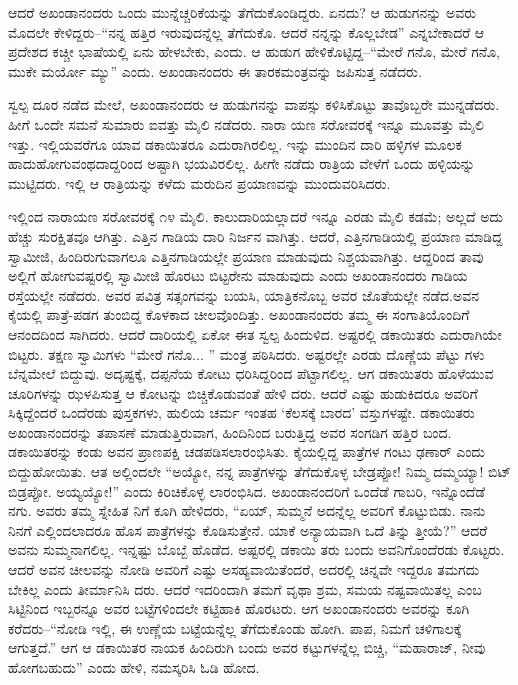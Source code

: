 ಆದರೆ ಅಖಂಡಾನಂದರು ಒಂದು ಮುನ್ನೆಚ್ಚರಿಕೆಯನ್ನು ತೆಗೆದುಕೊಂಡಿದ್ದರು. ಏನದು? ಆ ಹುಡುಗನನ್ನು ಅವರು ಮೊದಲೇ ಕೇಳಿದ್ದರು–“ನನ್ನ ಹತ್ತಿರ ಇರುವುದನ್ನೆಲ್ಲ ತೆಗೆದುಕೊ. ಆದರೆ ನನ್ನನ್ನು ಕೊಲ್ಲಬೇಡ” ಎನ್ನಬೇಕಾದರೆ ಆ ಪ್ರದೇಶದ ಕಚ್ಚೀ ಭಾಷೆಯಲ್ಲಿ ಏನು ಹೇಳಬೇಕು, ಎಂದು. ಆ ಹುಡುಗ ಹೇಳಿಕೊಟ್ಟಿದ್ದ–“ಮೇರೆ ಗನೊ, ಮೇರೆ ಗನೊ, ಮುಕೇ ಮರ್ಯೋ ಮ್ಯು” ಎಂದು. ಅಖಂಡಾನಂದರು ಈ ತಾರಕಮಂತ್ರವನ್ನು ಜಪಿಸುತ್ತ ನಡೆದರು.

ಸ್ವಲ್ಪ ದೂರ ನಡೆದ ಮೇಲೆ, ಅಖಂಡಾನಂದರು ಆ ಹುಡುಗನನ್ನು ವಾಪಸ್ಸು ಕಳಿಸಿಕೊಟ್ಟು ತಾವೊಬ್ಬರೇ ಮುನ್ನಡೆದರು. ಹೀಗೆ ಒಂದೇ ಸಮನೆ ಸುಮಾರು ಐವತ್ತು ಮೈಲಿ ನಡೆದರು. ನಾರಾ ಯಣ ಸರೋವರಕ್ಕೆ ಇನ್ನೂ ಮೂವತ್ತು ಮೈಲಿ ಇತ್ತು. ಇಲ್ಲಿಯವರೆಗೂ ಯಾವ ಡಕಾಯಿತರೂ ಎದುರಾಗಿರಲಿಲ್ಲ. ಇನ್ನು ಮುಂದಿನ ದಾರಿ ಹಳ್ಳಿಗಳ ಮೂಲಕ ಹಾದುಹೋಗುವಂಥದಾದ್ದರಿಂದ ಅಷ್ಟಾಗಿ ಭಯವಿರಲಿಲ್ಲ. ಹೀಗೇ ನಡೆದು ರಾತ್ರಿಯ ವೇಳೆಗೆ ಒಂದು ಹಳ್ಳಿಯನ್ನು ಮುಟ್ಟಿದರು. ಇಲ್ಲಿ ಆ ರಾತ್ರಿಯನ್ನು ಕಳೆದು ಮರುದಿನ ಪ್ರಯಾಣವನ್ನು ಮುಂದುವರಿಸಿದರು.

ಇಲ್ಲಿಂದ ನಾರಾಯಣ ಸರೋವರಕ್ಕೆ ೧೪ ಮೈಲಿ. ಕಾಲುದಾರಿಯಲ್ಲಾದರೆ ಇನ್ನೂ ಎರಡು ಮೈಲಿ ಕಡಮೆ; ಅಲ್ಲದೆ ಅದು ಹೆಚ್ಚು ಸುರಕ್ಷಿತವೂ ಆಗಿತ್ತು. ಎತ್ತಿನ ಗಾಡಿಯ ದಾರಿ ನಿರ್ಜನ ವಾಗಿತ್ತು. ಆದರೆ, ಎತ್ತಿನಗಾಡಿಯಲ್ಲಿ ಪ್ರಯಾಣ ಮಾಡಿದ್ದ ಸ್ವಾಮೀಜಿ, ಹಿಂದಿರುಗುವಾಗಲೂ ಎತ್ತಿನಗಾಡಿಯಲ್ಲೇ ಪ್ರಯಾಣ ಮಾಡುವುದು ನಿಶ್ಚಯವಾಗಿತ್ತು. ಆದ್ದರಿಂದ ತಾವು ಅಲ್ಲಿಗೆ ಹೋಗುವಷ್ಟರಲ್ಲಿ ಸ್ವಾಮೀಜಿ ಹೊರಟು ಬಿಟ್ಟರೇನು ಮಾಡುವುದು ಎಂದು ಅಖಂಡಾನಂದರು ಗಾಡಿಯ ರಸ್ತೆಯಲ್ಲೇ ನಡೆದರು. ಅವರ ಪವಿತ್ರ ಸತ್ಸಂಗವನ್ನು ಬಯಸಿ, ಯಾತ್ರಿಕನೊಬ್ಬ ಅವರ ಜೊತೆಯಲ್ಲೇ ನಡೆದ.ಅವನ ಕೈಯಲ್ಲಿ ಪಾತ್ರೆ-ಪಡಗ ತುಂಬಿದ್ದ ಕೊಳಕಾದ ಚೀಲವೊಂದಿತ್ತು. ಅಖಂಡಾನಂದರು ತಮ್ಮ ಈ ಸಂಗಾತಿಯೊಂದಿಗೆ ಆನಂದದಿಂದ ಸಾಗಿದರು. ಆದರೆ ದಾರಿಯಲ್ಲಿ ಏಕೋ ಈತ ಸ್ವಲ್ಪ ಹಿಂದುಳಿದ. ಅಷ್ಟರಲ್ಲಿ ಡಕಾಯಿತರು ಎದುರಾಗಿಯೇ ಬಿಟ್ಟರು. ತಕ್ಷಣ ಸ್ವಾಮಿಗಳು “ಮೇರೆ ಗನೊ... ” ಮಂತ್ರ ಪಠಿಸಿದರು. ಅಷ್ಟರಲ್ಲೇ ಎರಡು ದೊಣ್ಣೆಯ ಪೆಟ್ಟು ಗಳು ಬೆನ್ನಮೇಲೆ ಬಿದ್ದುವು. ಅದೃಷ್ಟಕ್ಕೆ, ದಪ್ಪನೆಯ ಕೋಟು ಧರಿಸಿದ್ದರಿಂದ ಪೆಟ್ಟಾಗಲಿಲ್ಲ. ಆಗ ಡಕಾಯಿತರು ಹೊಳೆಯುವ ಚೂರಿಗಳನ್ನು ಝಳಪಿಸುತ್ತ ಆ ಕೋಟನ್ನು ಬಿಚ್ಚಿಕೊಡುವಂತೆ ಹೇಳಿ ದರು. ಆದರೆ ಎಷ್ಟು ಹುಡುಕಿದರೂ ಅವರಿಗೆ ಸಿಕ್ಕಿದ್ದೆಂದರೆ ಒಂದೆರಡು ಪುಸ್ತಕಗಳು, ಹುಲಿಯ ಚರ್ಮ ಇಂತಹ ‘ಕೆಲಸಕ್ಕೆ ಬಾರದ’ ವಸ್ತುಗಳಷ್ಟೇ. ಡಕಾಯಿತರು ಅಖಂಡಾನಂದರನ್ನು ತಪಾಸಣೆ ಮಾಡುತ್ತಿರುವಾಗ, ಹಿಂದಿನಿಂದ ಬರುತ್ತಿದ್ದ ಅವರ ಸಂಗಡಿಗ ಹತ್ತಿರ ಬಂದ. ಡಕಾಯಿತರನ್ನು ಕಂಡು ಅವನ ಪ್ರಾಣಪಕ್ಷಿ ಚಡಪಡಿಸಲಾರಂಭಿಸಿತು. ಕೈಯಲ್ಲಿದ್ದ ಪಾತ್ರೆಗಳ ಗಂಟು ಢಣಾರ್ ಎಂದು ಬಿದ್ದುಹೋಯಿತು. ಆತ ಅಲ್ಲಿಂದಲೇ “ಅಯ್ಯೋ, ನನ್ನ ಪಾತ್ರೆಗಳನ್ನು ತೆಗೆದುಕೊಳ್ಳ ಬೇಡ್ರಪ್ಪೋ! ನಿಮ್ಮ ದಮ್ಮಯ್ಯಾ! ಬಿಟ್​ಬಿಡ್ರಪ್ಪೋ. ಅಯ್ಯಯ್ಯೋ!” ಎಂದು ಕಿರಿಚಿಕೊಳ್ಳ ಲಾರಂಭಿಸಿದ. ಅಖಂಡಾನಂದರಿಗೆ ಒಂದೆಡೆ ಗಾಬರಿ, ಇನ್ನೊಂದೆಡೆ ನಗು. ಅವರು ತಮ್ಮ ಸ್ನೇಹಿತ ನಿಗೆ ಕೂಗಿ ಹೇಳಿದರು, “ಏಯ್, ಸುಮ್ಮನೆ ಅದನ್ನೆಲ್ಲ ಅವರಿಗೆ ಕೊಟ್ಟುಬಿಡು. ನಾನು ನಿನಗೆ ಎಲ್ಲಿಂದಲಾದರೂ ಹೊಸ ಪಾತ್ರೆಗಳನ್ನು ಕೊಡಿಸುತ್ತೇನೆ. ಯಾಕೆ ಅನ್ಯಾಯವಾಗಿ ಒದೆ ತಿನ್ನು ತ್ತೀಯೆ?” ಆದರೆ ಅವನು ಸುಮ್ಮನಾಗಲಿಲ್ಲ. ಇನ್ನಷ್ಟು ಬೊಬ್ಬೆ ಹೊಡೆದ. ಅಷ್ಟರಲ್ಲಿ ಡಕಾಯಿ ತರು ಬಂದು ಅವನಿಗೊಂದೆರಡು ಕೊಟ್ಟರು. ಆದರೆ ಅವನ ಚೀಲವನ್ನು ನೋಡಿ ಅವರಿಗೆ ಎಷ್ಟು ಅಸಹ್ಯವಾಯಿತೆಂದರೆ, ಅದರಲ್ಲಿ ಚಿನ್ನವೇ ಇದ್ದರೂ ತಮಗದು ಬೇಕಿಲ್ಲ ಎಂದು ತೀರ್ಮಾನಿಸಿ ದರು. ಆದರೆ ಇದರಿಂದಾಗಿ ತಮಗೆ ವೃಥಾ ಶ್ರಮ, ಸಮಯ ನಷ್ಟವಾಯಿತಲ್ಲ ಎಂಬ ಸಿಟ್ಟಿನಿಂದ ಇಬ್ಬರನ್ನೂ ಅವರ ಬಟ್ಟೆಗಳಿಂದಲೇ ಕಟ್ಟಿಹಾಕಿ ಹೊರಟರು. ಆಗ ಅಖಂಡಾನಂದರು ಅವರನ್ನು ಕೂಗಿ ಕರೆದರು–“ನೋಡಿ ಇಲ್ಲಿ, ಈ ಉಣ್ಣೆಯ ಬಟ್ಟೆಯನ್ನೆಲ್ಲ ತೆಗೆದುಕೊಂಡು ಹೋಗಿ. ಪಾಪ, ನಿಮಗೆ ಚಳಿಗಾಲಕ್ಕೆ ಆಗುತ್ತದೆ.” ಆಗ ಆ ಡಕಾಯಿತರ ನಾಯಕ ಹಿಂದಿರುಗಿ ಬಂದು ಅವರ ಕಟ್ಟುಗಳನ್ನೆಲ್ಲ ಬಿಚ್ಚಿ, “ಮಹಾರಾಜ್, ನೀವು ಹೋಗಬಹುದು” ಎಂದು ಹೇಳಿ, ನಮಸ್ಕರಿಸಿ ಓಡಿ ಹೋದ.

